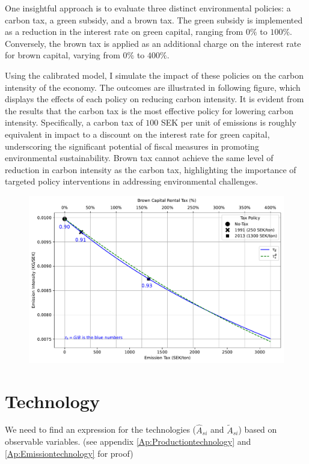 \documentclass[12pt]{article} %
\begin{document}
One insightful approach is to evaluate three distinct environmental policies: a carbon tax, a green subsidy, and a brown tax. The green subsidy is implemented as a reduction in the interest rate on green capital, ranging from $0\%$ to $100\%$. Conversely, the brown tax is applied as an additional charge on the interest rate for brown capital, varying from $0\%$ to $400\%$. 

Using the calibrated model, I simulate the impact of these policies on the carbon intensity of the economy. The outcomes are illustrated in following figure, which displays the effects of each policy on reducing carbon intensity. It is evident from the results that the carbon tax is the most effective policy for lowering carbon intensity. Specifically, a carbon tax of $100$ SEK per unit of emissions is roughly equivalent in impact to a  discount on the interest rate for green capital, underscoring the significant potential of fiscal measures in promoting environmental sustainability. Brown tax cannot achieve the same level of reduction in carbon intensity as the carbon tax, highlighting the importance of targeted policy interventions in addressing environmental challenges.


\begin{figure}[http]
    \centering
    \includegraphics[width=.8\textwidth]{Figures/intensity_tax_premium.pdf}
\end{figure}



\section*{Technology}
We need to find an expression for the technologies ($\hat{A}_{si}$ and $\tilde{A}_{si}$) based on observable variables. (see appendix \ref{Ap:Productiontechnology} and \ref{Ap:Emissiontechnology} for proof)
\end{document}
